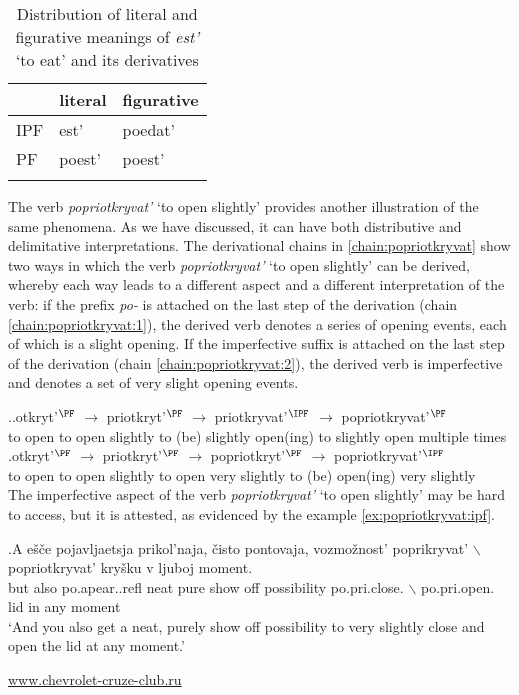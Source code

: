 \begin{table}
\caption{Distribution of literal and figurative meanings of \textit{est'} `to eat' and its derivatives \label{table:eat}}
\begin{tabular}{lll}
\lsptoprule
& literal & figurative \\ \midrule
IPF & est' & poedat' \\
PF & poest' & poest' \\ \lspbottomrule
\end{tabular}
\end{table}

The verb \textit{popriotkryvat'} `to open slightly' provides another illustration of the same phenomena. As we have discussed, it can have both distributive and delimitative interpretations. The derivational chains in \ref{chain:popriotkryvat} show two ways in which the verb \textit{popriotkryvat'} `to open slightly' can be derived, whereby each way leads to a different aspect and a different interpretation of the verb: if the prefix \textit{po-} is attached on the last step of the derivation (chain \ref{chain:popriotkryvat:1}), the derived verb denotes a series of opening events, each of which is a slight opening. If the imperfective suffix is attached on the last step of the derivation (chain \ref{chain:popriotkryvat:2}), the derived verb is imperfective and denotes a set of very slight opening events. 

\ex.\label{chain:popriotkryvat}\ag.\label{chain:popriotkryvat:1}otkryt'$^{\PF}$ $\rightarrow$ priotkryt'$^{\PF}$ $\rightarrow$ priotkryvat'$^{\IPF}$ $\rightarrow$ popriotkryvat'$^{\PF}$\\
{to open} {} {to open slightly} {} {to (be) slightly open(ing)} {} {to slightly open multiple times}\\
\bg.\label{chain:popriotkryvat:2}otkryt'$^{\PF}$ $\rightarrow$ priotkryt'$^{\PF}$ $\rightarrow$ popriotkryt'$^{\PF}$ $\rightarrow$ popriotkryvat'$^{\IPF}$\\
{to open} {} {to open slightly} {} {to open very slightly} {} {to (be) open(ing) very slightly}\\

The imperfective aspect of the verb \textit{popriotkryvat'} `to open slightly' may be hard to access, but it is attested, as evidenced by the example \ref{ex:popriotkryvat:ipf}. 

\exg.\label{ex:popriotkryvat:ipf}A e\v{s}\v{c}e pojavljaetsja prikol'naja, \v{c}isto pontovaja, vozmo\v{z}nost' poprikryvat' {$\backslash$} popriotkryvat' kry\v{s}ku v ljuboj moment.\\
but also po.apear..refl neat pure {show off} possibility po.pri.close. {$\backslash$} po.pri.open. lid in any moment\\
`And you also get a neat, purely show off possibility to very slightly close and open the lid at any moment.'
\begin{flushright}
\vspace{-0.5em}
\url{www.chevrolet-cruze-club.ru}
\end{flushright}

